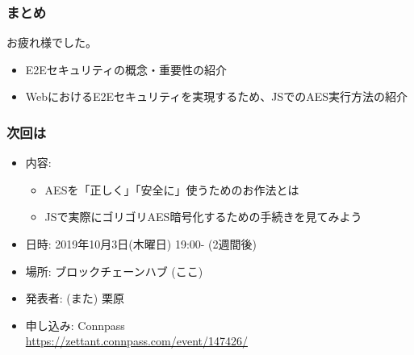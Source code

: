\documentclass[12pt,dvipdfmx]{beamer}
\newcommand{\backupbegin}{
   \newcounter{framenumberappendix}
   \setcounter{framenumberappendix}{\value{framenumber}}
}
\begin{document}
\begin{frame}
\frametitle{まとめ}
お疲れ様でした。

\begin{itemize}
\item E2Eセキュリティの概念・重要性の紹介
\item WebにおけるE2Eセキュリティを実現するため、JSでのAES実行方法の紹介
\end{itemize}


\end{frame}

\begin{frame}
\frametitle{次回は}
\begin{itemize}
 \item 内容: 
\begin{itemize}
 \item AESを「正しく」「安全に」使うためのお作法とは
 \item JSで実際にゴリゴリAES暗号化するための手続きを見てみよう
\end{itemize}
 \item 日時: 2019年10月3日(木曜日) 19:00- (2週間後)
 \item 場所: ブロックチェーンハブ (ここ)
 \item 発表者: (また) 栗原
 \item 申し込み: Connpass\\
\url{https://zettant.connpass.com/event/147426/}
\end{itemize}
\end{frame}





\end{document}
